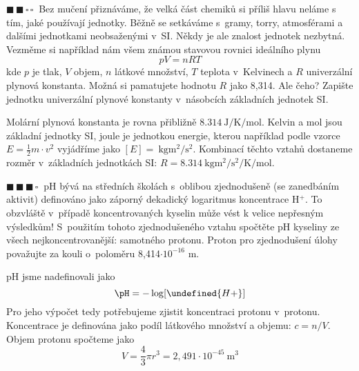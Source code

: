 \documentclass{book}
\let\ch\undefined
\newcommand{\dva}{$\blacksquare \, \blacksquare \, \square \, \square \; \; $}
\newcommand{\tri}{$\blacksquare \, \blacksquare \, \blacksquare \, \square \; \; $}
\renewenvironment{quotation}{\par}{\par} %
\begin{document}
\newpage %
\begin{quotation}
\dva Bez mučení přiznáváme, že velká část chemiků si příliš hlavu neláme
s tím, jaké používají jednotky. Běžně se setkáváme s~gramy, torry,
atmosférami a dalšími jednotkami neobsaženými v~SI. Někdy je ale znalost
jednotek nezbytná. Vezměme si například nám všem známou stavovou rovnici
ideálního plynu 
\[
pV=nRT
\]
kde $p$ je tlak, $V$ objem, $n$ látkové množství,
$T$ teplota v~Kelvinech a $R$ univerzální plynová konstanta. Možná si
pamatujete hodnotu $R$ jako 8,314. Ale čeho? Zapište jednotku univerzální
plynové konstanty v~násobcích základních jednotek SI.
\end{quotation} \dotfill \par 
Molární plynová konstanta je rovna přibližně $\SI[inter-unit-product = \ensuremath{{}\cdot{}}]{8,314}{\joule\per\kelvin\per\mole}$. Kelvin a mol jsou základní jednotky SI, joule je jednotkou energie,
kterou například podle vzorce $E=\frac{1}{2}m\cdot v^{2}$ vyjádříme
jako $[E]=\SI[inter-unit-product = \ensuremath{{}\cdot{}}]{}{\kilo\gram\metre\squared\per\second\squared}$.
Kombinací těchto vztahů dostaneme rozměr v~základních jednotkách SI: $R=\SI[inter-unit-product = \ensuremath{{}\cdot{}}]{8,314}{\kilo\gram\metre\squared\per\second\squared\per\kelvin\per\mole}$.

\hrulefill %
\begin{quotation}
\tri pH bývá na středních školách s~oblibou zjednodušeně (se zanedbáním
aktivit) definováno jako záporný dekadický logaritmus koncentrace
H$^{+}$. To obzvláště v~případě koncentrovaných kyselin může vést
k velice nepřesným výsledkům! S~použitím tohoto zjednodušeného vztahu
spočtěte pH kyseliny ze všech nejkoncentrovanější: samotného protonu.
Proton pro zjednodušení úlohy považujte za kouli o~poloměru 8,414$\cdot10^{-16}$
m.
\end{quotation} \dotfill \par 
pH jsme nadefinovali jako 
\[
\pH=-\log[\ch{H+}]
\]
Pro jeho výpočet tedy potřebujeme zjistit koncentraci protonu v~protonu.
Koncentrace je definována jako podíl látkového množství a objemu:
$c=n/V$. Objem protonu spočteme jako 
\[
V=\frac{4}{3}\pi r^{3}=2,491\cdot10^{-45}\mathrm{~m}^{3}
\]
\end{document}
